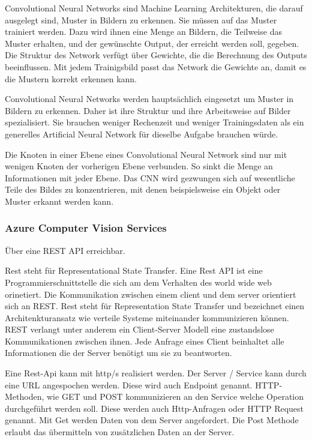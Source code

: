 Convolutional Neural Networks sind Machine Learning Architekturen, die darauf ausgelegt sind, Muster in Bildern zu erkennen. Sie müssen auf das Muster trainiert werden. Dazu wird ihnen eine Menge an Bildern, die Teilweise das Muster erhalten, und der gewünschte Output, der erreicht werden soll, gegeben. Die Struktur des Network verfügt über Gewichte, die die Berechnung des Outputs beeinflussen. Mit jedem Trainigsbild passt das Network die Gewichte an, damit es die Mustern korrekt erkennen kann.\citep{introToCNN,surveyOfDeepLearing}

Convolutional Neural Networks werden hauptsächlich eingesetzt um Muster in Bildern zu erkennen. Daher ist ihre Struktur und ihre Arbeitsweise auf Bilder spezialisiert. Sie brauchen weniger Rechenzeit und weniger Trainingsdaten als ein generelles Artificial Neural Network für dieselbe Aufgabe brauchen würde.\citep{introToCNN,surveyOfDeepLearing,cNNforClass} 

Die Knoten in einer Ebene eines Convolutional Neural Network sind nur mit wenigen Knoten der vorherigen Ebene verbunden. So sinkt die Menge an Informationen mit jeder Ebene. Das CNN wird gezwungen sich auf wesentliche Teile des Bildes zu konzentrieren, mit denen beispielsweise ein Objekt oder  Muster erkannt werden kann. \citep{introToCNN,surveyOfDeepLearing}

\subsubsection{Azure Computer Vision Services}

Über eine REST API erreichbar. 

Rest steht für Representational State Transfer. Eine Rest API ist eine Programmierschnittstelle die sich am dem Verhalten des world wide web orinetiert. Die Kommunikation zwischen einem client und dem server orientiert sich an REST.
Rest steht für Representation State Transfer und bezeichnet einen Architenkturansatz wie verteile Systeme miteinander kommunizieren können. REST verlangt unter anderem ein Client-Server Modell eine zustandslose Kommunikationen zwischen ihnen. Jede Anfrage eines Client beinhaltet alle Informationen die der Server benötigt um sie zu beantworten. %

Eine Rest-Api kann mit http/s realisiert werden. Der Server / Service kann durch eine URL angespochen werden. Diese wird auch Endpoint genannt. HTTP-Methoden, wie GET und POST kommunizieren an den Service welche Operation durchgeführt werden soll. Diese werden auch Http-Anfragen oder HTTP Request genannt. Mit Get werden Daten von dem Server angefordert. Die Post Methode erlaubt das übermitteln von zusätzlichen Daten an der Server.

